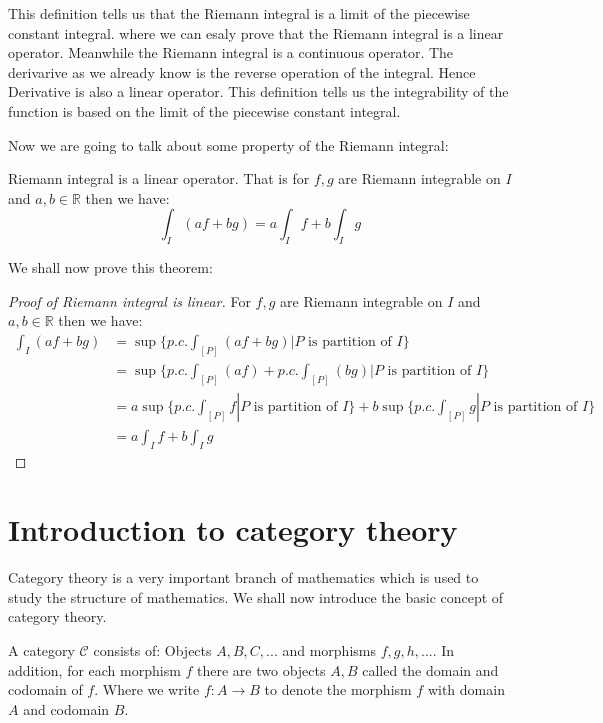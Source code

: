\documentclass{article}
\newcommand{\R}{\mathbb{R}}
\begin{document}
This definition tells us that the Riemann integral is a limit of the piecewise constant integral.
where we can esaly prove that the Riemann integral is a linear operator. Meanwhile the Riemann integral is a continuous operator. 
The derivarive as we already know is the reverse operation of the integral. Hence Derivative is also a linear operator. 
This definition tells us the integrability of the function is based on the limit of the piecewise constant integral. 


Now we are going to talk about some property of the Riemann integral:
\begin{theorem}
Riemann integral is a linear operator. That is for $f,g$ are Riemann integrable on $I$ and $a,b\in \R$ then we have:
$$\int_{I}(af+bg)=a\int_{I}f+b\int_{I}g$$
\end{theorem}

We shall now prove this theorem:

\begin{proof}[Proof of Riemann integral is linear]
  For $f,g$ are Riemann integrable on $I$ and $a,b\in \R$ then we have:
  \begin{equation*}
    \begin{aligned}
      \int_{I}(af+bg) &= \sup\{p.c.\int_{[P]}(af+bg)|P \text{ is partition of } I\}\\
      &= \sup\{p.c.\int_{[P]}(af)+p.c.\int_{[P]}(bg)|P \text{ is partition of } I\}\\
      &= a\sup\{p.c.\int_{[P]}f|P \text{ is partition of } I\}+b\sup\{p.c.\int_{[P]}g|P \text{ is partition of } I\}\\
      &= a\int_{I}f+b\int_{I}g
    \end{aligned}
  \end{equation*}
\end{proof}





\section{Introduction to category theory}
Category theory is a very important branch of mathematics which is used to study the structure of mathematics.
We shall now introduce the basic concept of category theory.

\begin{definition}[Category]
A category $\mathcal{C}$ consists of: Objects $A,B,C,...$ and morphisms $f,g,h,...$.
In addition, for each morphism $f$ there are two objects $A,B$ called the domain and codomain of $f$.
Where we write $f:A\to B$ to denote the morphism $f$ with domain $A$ and codomain $B$.
\end{definition}
\end{document}
